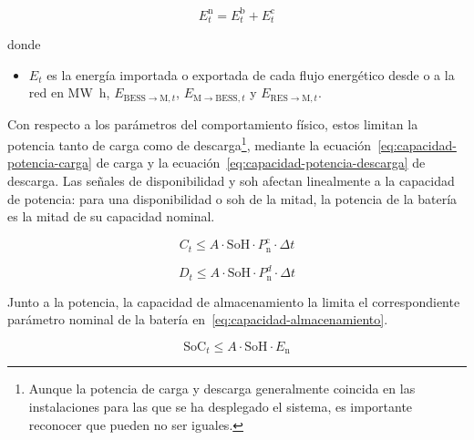 \begin{samepage}

  \begin{equation}%
    \label{eq:neto-bruto}
    E^{\mathrm{n}}_{t} = E^{\mathrm{b}}_{t} + E^{\mathrm{c}}_{t}
  \end{equation}

  donde

  \begin{itemize}

    \item \( E_{t} \) es la energía importada o exportada de cada flujo energético desde o a la red en \si{{\mega\watt\hour}}, \( E_{\mathrm{BESS} \rightarrow \mathrm{M}, t} \), \( E_{\mathrm{M} \rightarrow \mathrm{BESS}, t} \) y \( E_{\mathrm{RES} \rightarrow \mathrm{M}, t} \).

  \end{itemize}

\end{samepage}

Con respecto a los parámetros del comportamiento físico, estos limitan la potencia tanto de carga como de descarga\footnote{Aunque la potencia de carga y descarga generalmente coincida en las instalaciones para las que se ha desplegado el sistema, es importante reconocer que pueden no ser iguales.}, mediante la ecuación~\ref{eq:capacidad-potencia-carga} de carga y la ecuación~\ref{eq:capacidad-potencia-descarga} de descarga. Las señales de disponibilidad y \gls{soh} afectan linealmente a la capacidad de potencia: para una disponibilidad o \gls{soh} de la mitad, la potencia de la batería es la mitad de su capacidad nominal.

\begin{equation}%
  \label{eq:capacidad-potencia-carga}
  C_{t} \le A \cdot \mathrm{SoH} \cdot P^{\mathrm{c}}_{\mathrm{n}} \cdot \Delta t
\end{equation}

\begin{equation}%
  \label{eq:capacidad-potencia-descarga}
  D_{t} \le A \cdot \mathrm{SoH} \cdot P^{d}_{\mathrm{n}} \cdot \Delta t
\end{equation}

Junto a la potencia, la capacidad de almacenamiento la limita el correspondiente parámetro nominal de la batería en~\ref{eq:capacidad-almacenamiento}.

\begin{equation}%
  \label{eq:capacidad-almacenamiento}
  \mathrm{SoC}_{t} \le A \cdot \mathrm{SoH} \cdot E_{\mathrm{n}}
\end{equation}

